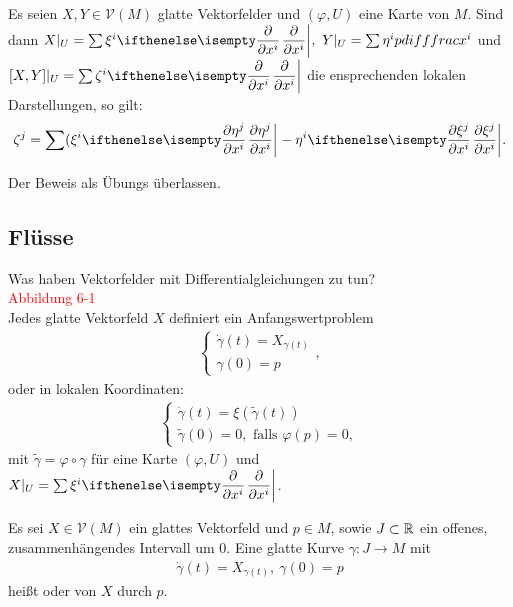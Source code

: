 \begin{lemma}
  Es seien $X,Y \in \mathcal V(M)$ glatte Vektorfelder und $(\varphi,U)$ eine Karte von $M$.
  Sind dann $X|_U = \sum \xi^i\pdifffrac{}{x^i}, \ Y|_U = \sum \eta^ipdifffrac{}{x^i}$ und $[X,Y]|_U = \sum \zeta^i \pdifffrac{}{x^i}$ die ensprechenden lokalen Darstellungen, so gilt:
  \begin{align*}
    \zeta^j = \sum (\xi^i\pdifffrac{\eta^j}{x^i} - \eta^i \pdifffrac{\xi^j}{x^i}.
  \end{align*}
\end{lemma} 

Der Beweis als Übungs überlassen.


\subsection{Flüsse}

Was haben Vektorfelder mit Differentialgleichungen zu tun?\\

\textcolor{red}{Abbildung 6-1}\\

Jedes glatte Vektorfeld $X$ definiert ein Anfangswertproblem
\begin{align*}
  \begin{cases}
    \dot \gamma(t) = X_{\gamma(t)}\\
    \gamma(0) = p
  \end{cases},
\end{align*}
oder in lokalen Koordinaten:
\begin{align*}
\begin{cases}
  \dot \gamma(t) = \xi(\tilde \gamma(t))\\
  \tilde \gamma(0) = 0, \text{ falls } \varphi(p) = 0,
\end{cases}
\end{align*}
mit $\tilde \gamma = \varphi \circ \gamma$ für eine Karte $(\varphi,U)$ und $X|_U = \sum \xi^i \pdifffrac{}{x^i}$.

\begin{dfn}
  Es sei $X \in \mathcal V(M)$ ein glattes Vektorfeld und $p \in M$, sowie $J \subset \operatorname{\mathbb{R}}$ ein offenes, zusammenhängendes Intervall um $0$. Eine glatte Kurve $\gamma \colon J \to M$ mit
  \begin{align*}
    \dot \gamma(t) = X_{\gamma(t)}, \ \gamma(0) = p
  \end{align*}
heißt  oder  von $X$ durch $p$.
\end{dfn}

